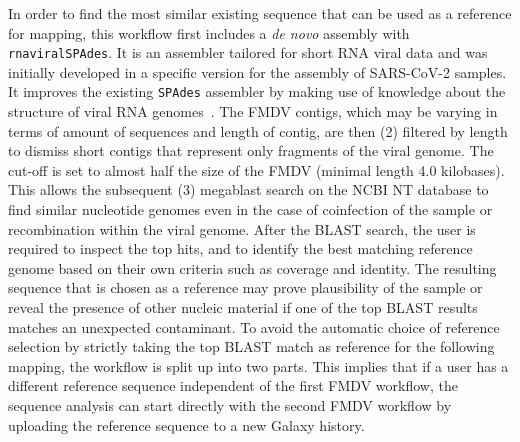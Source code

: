 In order to find the most similar existing sequence that can be used as a reference for mapping, this workflow first includes a \textit{de novo} assembly with \texttt{rnaviralSPAdes}. It is an assembler tailored for short \ac{RNA} viral data and was initially developed in a specific version for the assembly of \ac{SARS-CoV-2} samples. It improves the existing \texttt{SPAdes} assembler by making use of knowledge about the structure of viral \ac{RNA} genomes~\cite{meleshko2022coronaspades}. The \ac{FMDV} contigs, which may be varying in terms of amount of sequences and length of contig, are then (2) filtered by length to dismiss short contigs that represent only fragments of the viral genome. The cut-off is set to almost half the size of the \ac{FMDV} (minimal length 4.0 kilobases). This allows the subsequent (3) megablast search on the \ac{NCBI} NT database to find similar nucleotide genomes even in the case of coinfection of the sample or recombination within the viral genome. After the \ac{BLAST} search, the user is required to inspect the top hits, and to identify the best matching reference genome based on their own criteria such as coverage and identity. The resulting sequence that is chosen as a reference may prove plausibility of the sample or reveal the presence of other nucleic material if one of the top \ac{BLAST} results matches an unexpected contaminant. To avoid the automatic choice of reference selection by strictly taking the top \ac{BLAST} match as reference for the following mapping, the workflow is split up into two parts. This implies that if a user has a different reference sequence independent of the first \ac{FMDV} workflow, the sequence analysis can start directly with the second \ac{FMDV} workflow by uploading the reference sequence to a new Galaxy history.

